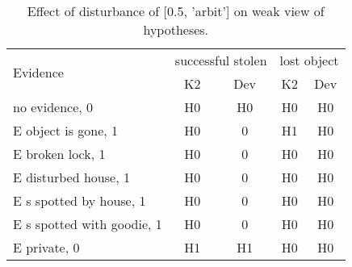 \begin{table}\begin{tabular}{l|cc|cc}\toprule\multirow{2}{*}{Evidence} & \multicolumn{2}{c}{successful stolen}& \multicolumn{2}{c}{lost object}\\& {K2} & {Dev}& {K2} & {Dev}\\\midrule
no evidence, 0 & H0&H0&H0&H0\\E object is gone, 1 & \cellcolor{Bittersweet}H0&\cellcolor{Bittersweet}0&\cellcolor{Bittersweet}H1&\cellcolor{Bittersweet}H0\\E broken lock, 1 & \cellcolor{Bittersweet}H0&\cellcolor{Bittersweet}0&H0&H0\\E disturbed house, 1 & \cellcolor{Bittersweet}H0&\cellcolor{Bittersweet}0&H0&H0\\E s spotted by house, 1 & \cellcolor{Bittersweet}H0&\cellcolor{Bittersweet}0&H0&H0\\E s spotted with goodie, 1 & \cellcolor{Bittersweet}H0&\cellcolor{Bittersweet}0&H0&H0\\E private, 0 & H1&H1&H0&H0\\\bottomrule\end{tabular}\caption{Effect of disturbance of [0.5, 'arbit'] on weak view of hypotheses.}\end{table}